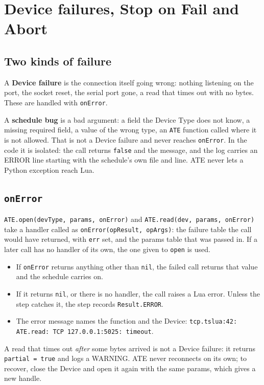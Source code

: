 \chapter{Device failures, Stop on Fail and Abort}\label{ch:errors}

\section{Two kinds of failure}

A \textbf{Device failure} is the connection itself going wrong: nothing listening on the port,
the socket reset, the serial port gone, a read that times out with no bytes. These are handled
with \texttt{onError}.

A \textbf{schedule bug} is a bad argument: a field the Device Type does not know, a missing
required field, a value of the wrong type, an \texttt{ATE} function called where it is not
allowed. That is not a Device failure and never reaches \texttt{onError}. In the code it is
isolated: the call returns \texttt{false} and the message, and the log carries an ERROR line
starting with the schedule's own file and line. ATE never lets a Python exception reach Lua.

\section{\texttt{onError}}

\texttt{ATE.open(devType, params, onError)} and \texttt{ATE.read(dev, params, onError)} take a
handler called as \texttt{onError(opResult, opArgs)}: the failure table the call would have
returned, with \texttt{err} set, and the params table that was passed in. If a later call has no
handler of its own, the one given to \texttt{open} is used.

\begin{itemize}
  \item If \texttt{onError} returns anything other than \texttt{nil}, the failed call returns
    that value and the schedule carries on.
  \item If it returns \texttt{nil}, or there is no handler, the call raises a Lua error. Unless
    the step catches it, the step records \texttt{Result.ERROR}.
  \item The error message names the function and the Device: \texttt{tcp.tslua:42: ATE.read:
    TCP 127.0.0.1:5025: timeout}.
\end{itemize}

A read that times out \emph{after} some bytes arrived is not a Device failure: it returns
\texttt{partial = true} and logs a WARNING. ATE never reconnects on its own; to recover, close
the Device and open it again with the same params, which gives a new handle.

